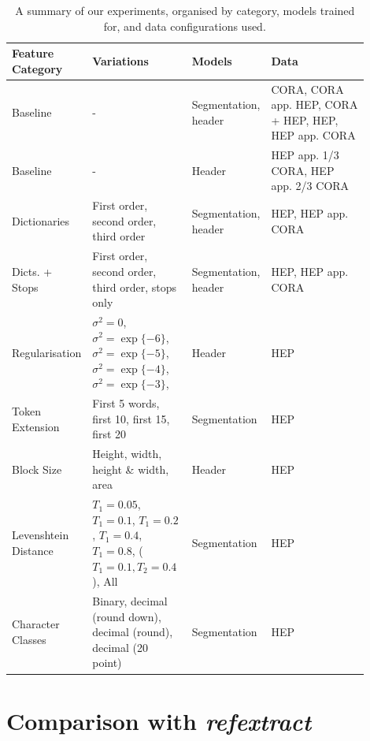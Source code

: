 \begin{table}[h]
\begin{center}
\begin{tabular}{ | p{0.2\linewidth} | p{0.25\linewidth} | p{0.15\linewidth} | p{0.3\linewidth} |}
\hline
Feature Category & Variations & Models & Data\\
\hline
Baseline & - & Segmentation, header & CORA, CORA app. HEP, CORA + HEP, HEP, HEP app. CORA \\
\hline
Baseline & - & Header & HEP app. 1/3 CORA, HEP app. 2/3 CORA \\
\hline
Dictionaries & First order, second order, third order & Segmentation, header & HEP, HEP app. CORA \\
\hline
Dicts. + Stops & First order, second order, third order, stops only & Segmentation, header & HEP, HEP app. CORA \\
\hline
Regularisation & $\sigma^2=0$, $\sigma^2=\exp\{-6\}$, $\sigma^2=\exp\{-5\}$, $\sigma^2=\exp\{-4\}$, $\sigma^2=\exp\{-3\}$, & Header & HEP \\
\hline
Token Extension & First 5 words, first 10, first 15, first 20 & Segmentation & HEP \\
\hline
Block Size & Height, width, height \& width, area & Header & HEP \\
\hline
Levenshtein Distance & $T_1 = 0.05$, $T_1 = 0.1$, $T_1 = 0.2$, $T_1 = 0.4$, $T_1 = 0.8$, ($T_1 = 0.1, T_2 = 0.4$), All & Segmentation & HEP \\
\hline
Character Classes & Binary, decimal (round down), decimal (round), decimal (20 point) & Segmentation & HEP \\
\hline
\end{tabular}
\caption[A summary of our experiments, organised by category, models trained for, and data configurations used.]{A summary of our experiments, organised by category, models trained for, and data configurations used.}
\label{table:experiments}
\end{center}
\end{table}

\section{Comparison with \emph{refextract}}
\label{sec:refextract}

